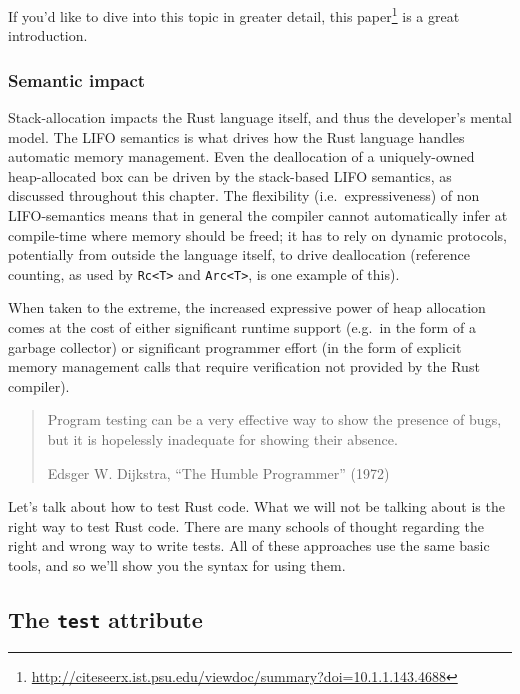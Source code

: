 \documentclass[a4paper,]{book}
\renewcommand{\href}[2]{#2\footnote{\url{#1}}}
\begin{document}
If you'd like to dive into this topic in greater detail,
\href{http://citeseerx.ist.psu.edu/viewdoc/summary?doi=10.1.1.143.4688}{this
paper} is a great introduction.

\subsubsection{Semantic impact}\label{semantic-impact}

Stack-allocation impacts the Rust language itself, and thus the
developer's mental model. The LIFO semantics is what drives how the Rust
language handles automatic memory management. Even the deallocation of a
uniquely-owned heap-allocated box can be driven by the stack-based LIFO
semantics, as discussed throughout this chapter. The flexibility
(i.e.~expressiveness) of non LIFO-semantics means that in general the
compiler cannot automatically infer at compile-time where memory should
be freed; it has to rely on dynamic protocols, potentially from outside
the language itself, to drive deallocation (reference counting, as used
by \texttt{Rc\textless{}T\textgreater{}} and
\texttt{Arc\textless{}T\textgreater{}}, is one example of this).

When taken to the extreme, the increased expressive power of heap
allocation comes at the cost of either significant runtime support
(e.g.~in the form of a garbage collector) or significant programmer
effort (in the form of explicit memory management calls that require
verification not provided by the Rust compiler).


\begin{quote}
Program testing can be a very effective way to show the presence of
bugs, but it is hopelessly inadequate for showing their absence.

Edsger W. Dijkstra, ``The Humble Programmer'' (1972)
\end{quote}

Let's talk about how to test Rust code. What we will not be talking
about is the right way to test Rust code. There are many schools of
thought regarding the right and wrong way to write tests. All of these
approaches use the same basic tools, and so we'll show you the syntax
for using them.

\subsection{\texorpdfstring{The \texttt{test}
attribute}{The test attribute}}\label{the-test-attribute}
\end{document}
